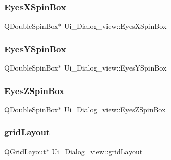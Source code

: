 \subsubsection{\texorpdfstring{Eyes\+X\+Spin\+Box}{EyesXSpinBox}}
{\footnotesize\ttfamily Q\+Double\+Spin\+Box$\ast$ Ui\+\_\+\+Dialog\+\_\+view\+::\+Eyes\+X\+Spin\+Box}

\hypertarget{class_ui___dialog__view_ab168044e11d249b7a1691544cb0a9a78}{}\label{class_ui___dialog__view_ab168044e11d249b7a1691544cb0a9a78} 
\subsubsection{\texorpdfstring{Eyes\+Y\+Spin\+Box}{EyesYSpinBox}}
{\footnotesize\ttfamily Q\+Double\+Spin\+Box$\ast$ Ui\+\_\+\+Dialog\+\_\+view\+::\+Eyes\+Y\+Spin\+Box}

\hypertarget{class_ui___dialog__view_ab57dcc3630e280bf882e0d2112536570}{}\label{class_ui___dialog__view_ab57dcc3630e280bf882e0d2112536570} 
\subsubsection{\texorpdfstring{Eyes\+Z\+Spin\+Box}{EyesZSpinBox}}
{\footnotesize\ttfamily Q\+Double\+Spin\+Box$\ast$ Ui\+\_\+\+Dialog\+\_\+view\+::\+Eyes\+Z\+Spin\+Box}

\hypertarget{class_ui___dialog__view_a77d16d3ffbeacd2ea7f8ffef5bd4efc3}{}\label{class_ui___dialog__view_a77d16d3ffbeacd2ea7f8ffef5bd4efc3} 
\subsubsection{\texorpdfstring{grid\+Layout}{gridLayout}}
{\footnotesize\ttfamily Q\+Grid\+Layout$\ast$ Ui\+\_\+\+Dialog\+\_\+view\+::grid\+Layout}

\hypertarget{class_ui___dialog__view_afca9ea5a2e97534872dbe646959e84fd}{}\label{class_ui___dialog__view_afca9ea5a2e97534872dbe646959e84fd} 
